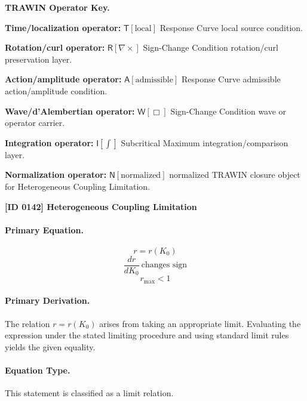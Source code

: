 \par\vspace{0.45\baselineskip}
\noindent\begin{minipage}[t]{\linewidth}
\begingroup
\small
\raggedright
\textbf{TRAWIN Operator Key.}\par
\noindent\textbf{Time/localization operator:} $\mathsf{T}\!\left[\mathrm{local}\right]$ Response Curve local source condition.\par
\noindent\textbf{Rotation/curl operator:} $\mathsf{R}\!\left[\nabla\times\right]$ Sign-Change Condition rotation/curl preservation layer.\par
\noindent\textbf{Action/amplitude operator:} $\mathsf{A}\!\left[\mathrm{admissible}\right]$ Response Curve admissible action/amplitude condition.\par
\noindent\textbf{Wave/d'Alembertian operator:} $\mathsf{W}\!\left[\Box\right]$ Sign-Change Condition wave or operator carrier.\par
\noindent\textbf{Integration operator:} $\mathsf{I}\!\left[\int\right]$ Subcritical Maximum integration/comparison layer.\par
\noindent\textbf{Normalization operator:} $\mathsf{N}\!\left[\mathrm{normalized}\right]$ normalized TRAWIN closure object for Heterogeneous Coupling Limitation.\par
\endgroup
\end{minipage}

\clearpage
\noindent\textbf{[ID 0142] Heterogeneous Coupling Limitation}\par
\vspace{0.35em}
\paragraph{Primary Equation.}
\[
r=r(K_0)
\]
\[
\frac{dr}{dK_0}\ \text{changes sign}
\]
\[
r_{\max}<1
\]

\paragraph{Primary Derivation.}
The relation \( r=r(K_0) \) arises from taking an appropriate limit. Evaluating the expression under the stated limiting procedure and using standard limit rules yields the given equality.
\paragraph{Equation Type.}
This statement is classified as a limit relation.

